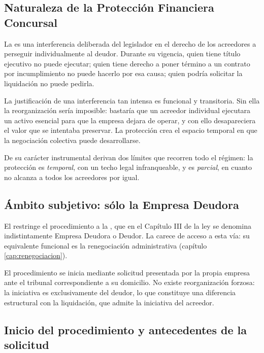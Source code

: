 \subsection{Naturaleza de la Protección Financiera Concursal}

La \pfc{} es una interferencia deliberada del legislador en el derecho de los acreedores a
perseguir individualmente al deudor. Durante su vigencia, quien tiene título ejecutivo no
puede ejecutar; quien tiene derecho a poner término a un contrato por incumplimiento no
puede hacerlo por esa causa; quien podría solicitar la liquidación no puede pedirla.

La justificación de una interferencia tan intensa es funcional y transitoria. Sin ella la
reorganización sería imposible: bastaría que un acreedor individual ejecutara un activo
esencial para que la empresa dejara de operar, y con ello desapareciera el valor que se
intentaba preservar. La protección crea el espacio temporal en que la negociación
colectiva puede desarrollarse.

De su carácter instrumental derivan dos límites que recorren todo el régimen: la protección
es \emph{temporal}, con un techo legal infranqueable, y es \emph{parcial}, en cuanto no
alcanza a todos los acreedores por igual.

\subsection{Ámbito subjetivo: sólo la Empresa Deudora}

El  restringe el procedimiento a la \empresadeudora{}, que en el Capítulo III de la
ley se denomina indistintamente Empresa Deudora o Deudor. La \personadeudora{} carece de
acceso a esta vía: su equivalente funcional es la renegociación administrativa (capítulo
\ref{cap:renegociacion}).

El procedimiento se inicia mediante solicitud presentada por la propia empresa ante el
tribunal correspondiente a su domicilio. No existe reorganización forzosa: la iniciativa es
exclusivamente del deudor, lo que constituye una diferencia estructural con la liquidación,
que admite la iniciativa del acreedor.

\bloqueNormativo

\subsection{Inicio del procedimiento y antecedentes de la solicitud}

